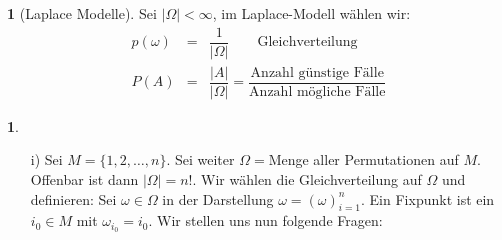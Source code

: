 \documentclass[10pt,a4paper]{report}
\numberwithin{equation}{section}
\numberwithin{figure}{section}
\theoremstyle{plain}
\theoremstyle{definition}
\newtheorem{example}[thm]{\protect\examplename}
\theoremstyle{remark}
\theoremstyle{plain}
\providecommand{\examplename}{Beispiel}
\newcommand{\1}{ \mathbb{1} } %
\begin{document}
\begin{example}[Laplace Modelle]
  Sei $|\Omega|<\infty$, im Laplace-Modell wählen wir:
  \begin{eqnarray*}
    p(\omega)&=&\dfrac{1}{|\Omega|} \qquad \text{Gleichverteilung}\\
    P(A)&=&\dfrac{|A|}{|\Omega|}=\dfrac{\text{Anzahl günstige Fälle}}{\text{Anzahl mögliche Fälle}}
  \end{eqnarray*}
 \end{example}
\begin{example} \ %
  \begin{itemize}
  \item[i)] Sei $M=\{1,2,\dots,n\}$. Sei weiter $\Omega=$Menge aller Permutationen auf $M$. Offenbar ist dann $|\Omega|=n!$. Wir wählen die Gleichverteilung auf $\Omega$ und definieren:
    Sei $\omega \in \Omega$ in der Darstellung $\omega=(\omega)_{i=1}^n$. Ein Fixpunkt ist ein $i_0 \in M$ mit $\omega_{i_0}=i_0$.
    Wir stellen uns nun folgende Fragen:
    

\end{itemize}
\end{example}
\end{document}
